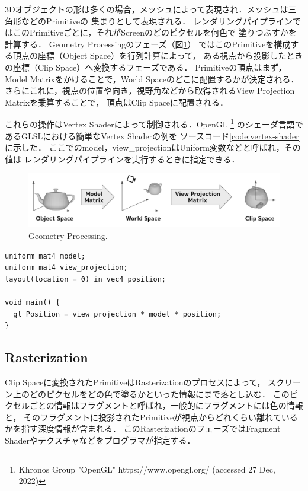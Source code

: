 3Dオブジェクトの形は多くの場合，メッシュによって表現され．メッシュは三角形などのPrimitiveの
集まりとして表現される．
レンダリングパイプラインではこのPrimitiveごとに，それがScreenのどのピクセルを何色で
塗りつぶすかを計算する．
Geometry Processingのフェーズ（図\ref{fig:geometry-processing}）
ではこのPrimitiveを構成する頂点の座標（Object Space）を行列計算によって，
ある視点から投影したときの座標（Clip Space）へ変換するフェーズである．
Primitiveの頂点はまず，Model Matrixをかけることで，World Spaceのどこに配置するかが決定される．
さらにこれに，視点の位置や向き，視野角などから取得されるView Projection Matrixを乗算することで，
頂点はClip Spaceに配置される．

これらの操作はVertex Shaderによって制御される．OpenGL
\footnote{Khronos Group "OpenGL" https://www.opengl.org/ (accessed 27 Dec, 2022)}
のシェーダ言語であるGLSLにおける簡単なVertex Shaderの例を
ソースコード\ref{code:vertex-shader}に示した．
ここでのmodel，view\_projectionはUniform変数などと呼ばれ，その値は
レンダリングパイプラインを実行するときに指定できる．

\begin{figure}[htbp]
  \centering
  \includegraphics[keepaspectratio, width=\linewidth]{figures/geometry-processing.png}
  \caption{
    Geometry Processing.
  }
  \label{fig:geometry-processing}
\end{figure}

\begin{lstlisting}[caption=Vertex Shaderの例, label=code:vertex-shader]
uniform mat4 model;
uniform mat4 view_projection;
layout(location = 0) in vec4 position;

void main() {
  gl_Position = view_projection * model * position;
}
\end{lstlisting}

\subsection*{Rasterization}

Clip Spaceに変換されたPrimitiveはRasterizationのプロセスによって，
スクリーン上のどのピクセルをどの色で塗るかといった情報にまで落とし込む．
このピクセルごとの情報はフラグメントと呼ばれ，一般的にフラグメントには色の情報と，
そのフラグメントに投影されたPrimitiveが視点からどれくらい離れているかを指す深度情報が含まれる．
このRasterizationのフェーズではFragment Shaderやテクスチャなどをプログラマが指定する．

